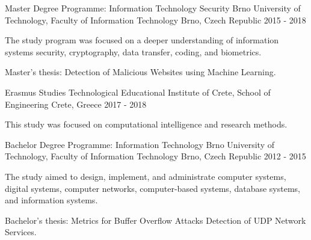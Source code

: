 \begin{cventries}

  \cventry
    {Master Degree Programme: Information Technology Security}
    {Brno University of Technology, Faculty of Information Technology}
    {Brno, Czech Republic}
    {2015 - 2018}
    {
      \begin{cvitems}
        \item {The study program was focused on a deeper understanding of information systems security, cryptography, data transfer, coding, and biometrics.}
        \item {Master's thesis: Detection of Malicious Websites using Machine Learning.}
      \end{cvitems}
    }

  \cventry
    {Erasmus Studies}
    {Technological Educational Institute of Crete, School of Engineering}
    {Crete, Greece}
    {2017 - 2018}
    {
      \begin{cvitems}
        \item {This study was focused on computational intelligence and research methods.}
      \end{cvitems}
    }

  \cventry
    {Bachelor Degree Programme: Information Technology}
    {Brno University of Technology, Faculty of Information Technology}
    {Brno, Czech Republic}
    {2012 - 2015}
    {
      \begin{cvitems}
        \item {The study aimed to design, implement, and administrate computer systems, digital systems, computer networks, computer-based systems, database systems, and information systems.}
        \item {Bachelor's thesis: Metrics for Buffer Overflow Attacks Detection of UDP Network Services.}
      \end{cvitems}
    }
\end{cventries}